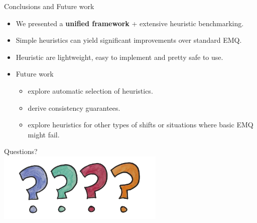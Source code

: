 \documentclass[aspectratio=169]{beamer}
\begin{document}
\begin{frame}{Conclusions and Future work}
  \begin{itemize}
    \item We presented a \textbf{unified framework} + extensive heuristic benchmarking.
    \item Simple heuristics can yield significant improvements over standard EMQ.
    \item Heuristic are lightweight, easy to implement and pretty safe to use.
    \item Future work
    \begin{itemize} 
      \item explore automatic selection of heuristics.
      \item derive consistency guarantees.
      \item explore heuristics for other types of shifts or situations where basic EMQ might fail.
    \end{itemize}
  \end{itemize}
\end{frame}

\begin{frame}
  \centering
  \Huge
Questions?
\\ 
\vspace{1cm}
\includegraphics[width=0.6\textwidth]{images/questions.png}
\end{frame}
\end{document}
